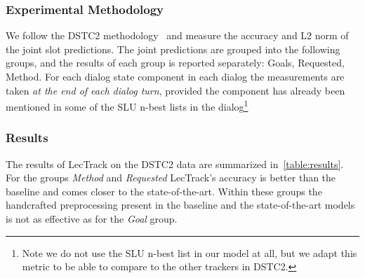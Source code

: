 \documentclass[10pt,twocolumn]{article}
\begin{document}
\subsubsection{Experimental Methodology}  %
We follow the DSTC2 methodology~\cite{henderson2014second} and measure the accuracy and L2 norm of the joint slot predictions.
The joint predictions are grouped into the following groups, and the results of each group is reported separately: Goals, Requested, Method.
For each dialog state component in each dialog the measurements are taken \emph{at the end of each dialog turn}, provided the component has already been mentioned in some of the SLU n-best lists in the dialog\footnote{Note we do not use the SLU n-best list in our model at all, but we adapt this metric to be able to compare to the other trackers in DSTC2.}


\subsubsection{Results}
The results of LecTrack on the DSTC2 data are summarized in~\autoref{table:results}. For the groups \emph{Method} and \emph{Requested} LecTrack's accuracy is better than the baseline and comes closer to the state-of-the-art. Within these groups the handcrafted preprocessing present in the baseline and the state-of-the-art models is not as effective as for the \emph{Goal} group.
\end{document}
